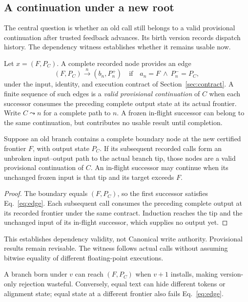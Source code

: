 \subsection{A continuation under a new root}
The central question is whether an old call still belongs to a valid
provisional continuation after trusted feedback advances. Its birth version
records dispatch history. The dependency witness establishes whether it
remains usable now.

Let $x=(F,P_C)$. A complete recorded node provides an edge
\begin{equation}
 (F,P_C)\xrightarrow{n}(b_n,P_n^+)
 \quad\text{if}\quad a_n=F\ \land\ P_n^-=P_C,
 \label{eq:edge}
\end{equation}
under the input, identity, and execution contract of
Section~\ref{sec:contract}. A finite sequence of such edges is a
\emph{valid provisional continuation} of $C$ when each successor consumes
the preceding complete output state at its actual frontier. Write
$C\leadsto n$ for a complete path to $n$. A frozen in-flight successor can
belong to the same continuation, but contributes no usable result until
completion.

\begin{proposition}
\label{prop:rebase}
Suppose an old branch contains a complete boundary node at the new certified
frontier $F$, with output state $P_C$. If its subsequent recorded calls form
an unbroken input--output path to the actual branch tip, those nodes are a
valid provisional continuation of $C$. An in-flight successor may continue
when its unchanged frozen input is that tip and its target exceeds $F$.
\end{proposition}
\begin{proof}
The boundary equals $(F,P_C)$, so the first successor satisfies
Eq.~\eqref{eq:edge}. Each subsequent call consumes the preceding complete
output at its recorded frontier under the same contract. Induction reaches
the tip and the unchanged input of its in-flight successor, which supplies
no output yet.
\end{proof}

This establishes dependency validity, not Canonical write authority.
Provisional results remain revisable. The witness follows actual calls
without assuming bitwise equality of different floating-point executions.

A branch born under $v$ can reach $(F,P_C)$ when $v+1$ installs, making
version-only rejection wasteful. Conversely, equal text can hide different
tokens or alignment state; equal state at a different frontier also fails
Eq.~\eqref{eq:edge}.

